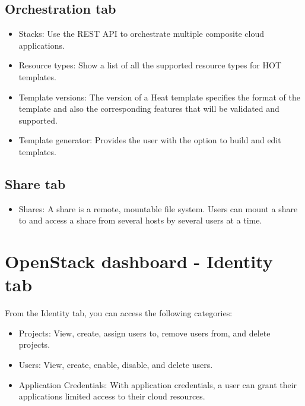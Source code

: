 \subsection*{\texorpdfstring{Orchestration
tab}{Orchestration tab}}\label{orchestration-tab}

\begin{itemize}
\item
  Stacks: Use the REST API to orchestrate multiple composite cloud applications.
\item
  Resource types: Show a list of all the supported resource types for HOT templates.
\item
  Template versions: The version of a Heat template specifies the format of the template and also the corresponding features that will be validated and supported.
\item
  Template generator: Provides the user with the option to build and edit templates. 
\end{itemize}

\subsection*{\texorpdfstring{Share
tab}{Shares tab}}\label{shares-tab}

\begin{itemize}
\item
  Shares: A share is a remote, mountable file system. Users can mount a share to and access a share from several hosts by several users at a time.
\end{itemize}

\section*{OpenStack dashboard - Identity
tab}\label{openstack-dashboard---identity-tab}

From the Identity tab, you can access the following categories:

\begin{itemize}
\item
  Projects: View, create, assign users to, remove users from, and delete
  projects.
\item
  Users: View, create, enable, disable, and delete users.
\item
  Application Credentials: With application credentials, a user can grant their applications limited access to their cloud resources.
\end{itemize}

